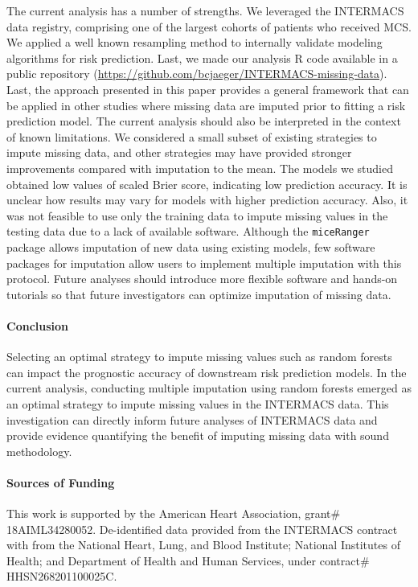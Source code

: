 \documentclass{article}
\begin{document}
The current analysis has a number of strengths. We leveraged the
INTERMACS data registry, comprising one of the largest cohorts of
patients who received MCS. We applied a well known resampling method to
internally validate modeling algorithms for risk prediction. Last, we
made our analysis R code available in a public repository
(\url{https://github.com/bcjaeger/INTERMACS-missing-data}). Last, the
approach presented in this paper provides a general framework that can
be applied in other studies where missing data are imputed prior to
fitting a risk prediction model. The current analysis should also be
interpreted in the context of known limitations. We considered a small
subset of existing strategies to impute missing data, and other
strategies may have provided stronger improvements compared with
imputation to the mean. The models we studied obtained low values of
scaled Brier score, indicating low prediction accuracy. It is unclear
how results may vary for models with higher prediction accuracy. Also,
it was not feasible to use only the training data to impute missing
values in the testing data due to a lack of available software. Although
the \texttt{miceRanger} package allows imputation of new data using
existing models, few software packages for imputation allow users to
implement multiple imputation with this protocol. Future analyses should
introduce more flexible software and hands-on tutorials so that future
investigators can optimize imputation of missing data.

\paragraph{Conclusion}

Selecting an optimal strategy to impute missing values such as random
forests can impact the prognostic accuracy of downstream risk prediction
models. In the current analysis, conducting multiple imputation using
random forests emerged as an optimal strategy to impute missing values
in the INTERMACS data. This investigation can directly inform future
analyses of INTERMACS data and provide evidence quantifying the benefit
of imputing missing data with sound methodology.

\paragraph{Sources of Funding}

This work is supported by the American Heart Association, grant\#
18AIML34280052. De-identified data provided from the INTERMACS contract
with from the National Heart, Lung, and Blood Institute; National
Institutes of Health; and Department of Health and Human Services, under
contract\# HHSN268201100025C.
\end{document}
